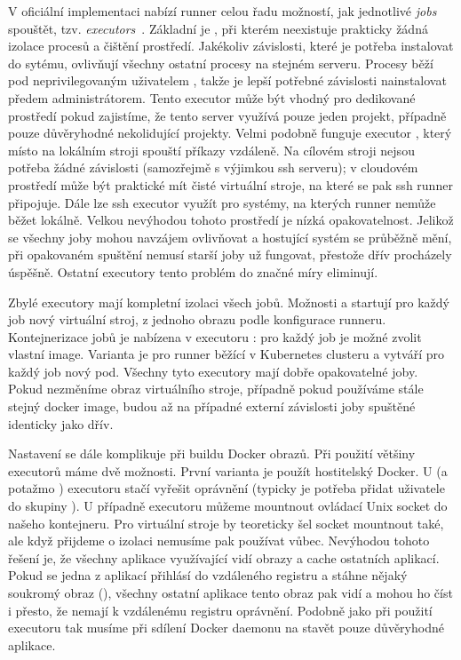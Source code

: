         \label{gitlab-executor}
        V oficiální implementaci nabízí runner celou řadu možností, jak jednotlivé \textit{jobs} spouštět, tzv. \textit{executors}~\cite{gitlab-runner-config}. Základní je , při kterém neexistuje prakticky žádná izolace procesů a čištění prostředí. Jakékoliv závislosti, které je potřeba instalovat do sytému, ovlivňují všechny ostatní procesy na stejném serveru. Procesy běží pod neprivilegovaným uživatelem , takže je lepší potřebné závislosti nainstalovat předem administrátorem. Tento executor může být vhodný pro dedikované prostředí pokud zajistíme, že tento server využívá pouze jeden projekt, případně pouze důvěryhodné nekolidující projekty. Velmi podobně funguje executor , který místo na lokálním stroji spouští příkazy vzdáleně. Na cílovém stroji nejsou potřeba žádné závislosti (samozřejmě s výjimkou ssh serveru); v cloudovém prostředí může být praktické mít čisté virtuální stroje, na které se pak ssh runner připojuje. Dále lze ssh executor využít pro systémy, na kterých runner nemůže běžet lokálně. Velkou nevýhodou tohoto prostředí je nízká opakovatelnost. Jelikož se všechny joby mohou navzájem ovlivňovat a hostující systém se průběžně mění, při opakovaném spuštění nemusí starší joby už fungovat, přestože dřív procházely úspěšně. Ostatní executory tento problém do značné míry eliminují.

        Zbylé executory mají kompletní izolaci všech jobů. Možnosti  a  startují pro každý job nový virtuální stroj, z jednoho obrazu podle konfigurace runneru. Kontejnerizace jobů je nabízena v executoru : pro každý job je možné zvolit vlastní image. Varianta  je pro runner běžící v Kubernetes clusteru a vytváří pro každý job nový pod. Všechny tyto executory mají dobře opakovatelné joby. Pokud nezměníme obraz virtuálního stroje, případně pokud používáme stále stejný docker image, budou až na případné externí závislosti joby spuštěné identicky jako dřív.

        \label{sec:gitlab-ci-docker}
        Nastavení \CI se dále komplikuje při buildu Docker obrazů. Při použití většiny executorů máme dvě možnosti. První varianta je použít hostitelský Docker. U  (a potažmo ) executoru stačí vyřešit oprávnění (typicky je potřeba přidat uživatele  do skupiny ). U  případně  executoru můžeme mountnout ovládací Unix socket  do našeho kontejneru. Pro virtuální stroje by teoreticky šel socket mountnout také, ale když přijdeme o izolaci nemusíme pak  používat vůbec. Nevýhodou tohoto řešení je, že všechny aplikace využívající \CI vidí obrazy a cache ostatních aplikací. Pokud se jedna z aplikací přihlásí do vzdáleného registru a stáhne nějaký soukromý obraz (), všechny ostatní aplikace tento obraz pak vidí a mohou ho číst i přesto, že nemají k vzdálenému registru oprávnění. Podobně jako při použití  executoru tak musíme při sdílení Docker daemonu na \CI stavět pouze důvěryhodné aplikace.

